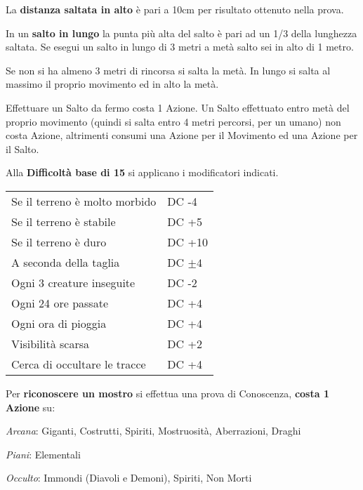 \documentclass[landscape,10pt,a4paper]{article}
\begin{document}
\begin{multicols}{3}
\begin{dmbox}[title=Atletica - pagina \pageref{atletica}]
La \textbf{distanza saltata in alto} è pari a 10cm per risultato ottenuto nella prova.

In un \textbf{salto in lungo} la punta più alta del salto è pari ad un 1/3 della lunghezza saltata. Se esegui un salto in lungo di 3 metri a metà salto sei in alto di 1 metro.

Se non si ha almeno 3 metri di rincorsa si salta la metà. In lungo si salta al massimo il proprio movimento ed in alto la metà.

Effettuare un Salto da fermo costa 1 Azione. Un Salto effettuato entro metà del proprio movimento (quindi si salta entro 4 metri percorsi, per un umano) non costa Azione, altrimenti consumi una Azione per il Movimento ed una Azione per il Salto.
\end{dmbox}



\begin{dmbox}[title=Seguire Tracce - pagina \pageref{seguiretracce}]
	Alla \textbf{Difficoltà base di 15} si applicano i modificatori indicati.\\

	\noindent\begin{tabular}{ll}
		Se il terreno è molto morbido& DC -4\\
		Se il terreno è stabile& DC +5\\
		Se il terreno è duro& DC +10\\
		A seconda della taglia& DC $\pm4$\\
		Ogni 3 creature inseguite& DC -2\\
		Ogni 24 ore passate& DC +4\\
		Ogni ora di pioggia& DC +4\\
		Visibilità scarsa& DC +2\\
		Cerca di occultare le tracce& DC +4\\
	\end{tabular}
\end{dmbox}

\begin{dmbox}[title=Riconoscere i mostri - pagina \pageref{riconosceremostro}]

Per \textbf{riconoscere un mostro} si effettua una prova di Conoscenza, \textbf{costa 1 Azione} su:

\medskip

\emph{Arcana}: Giganti, Costrutti, Spiriti, Mostruosità, Aberrazioni, Draghi

\emph{Piani}: Elementali

\emph{Occulto}: Immondi (Diavoli e Demoni), Spiriti, Non Morti


\end{dmbox}
\end{multicols}
\end{document}
